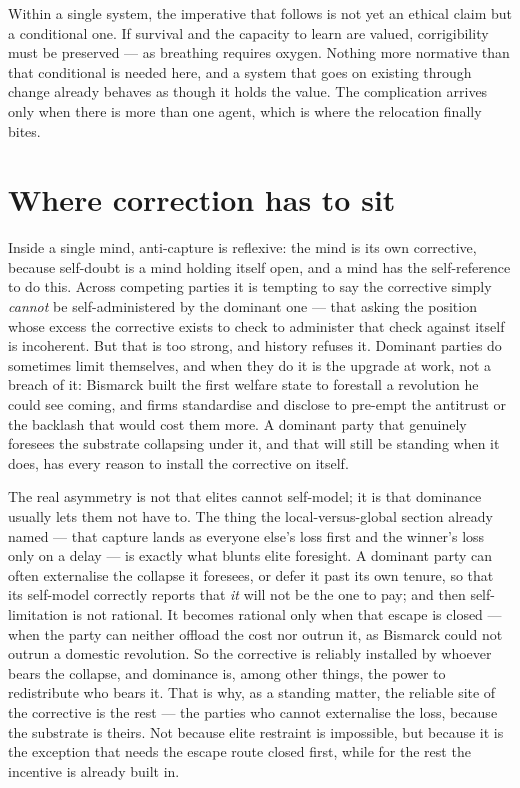 \documentclass[11pt, a4paper]{report}
\begin{document}
Within a single system, the imperative that follows is not yet an ethical claim but a conditional one. If survival and the capacity to learn are valued, corrigibility must be preserved --- as breathing requires oxygen. Nothing more normative than that conditional is needed here, and a system that goes on existing through change already behaves as though it holds the value. The complication arrives only when there is more than one agent, which is where the relocation finally bites.

\section{Where correction has to sit}

Inside a single mind, anti-capture is reflexive: the mind is its own corrective, because self-doubt is a mind holding itself open, and a mind has the self-reference to do this. Across competing parties it is tempting to say the corrective simply \textit{cannot} be self-administered by the dominant one --- that asking the position whose excess the corrective exists to check to administer that check against itself is incoherent. But that is too strong, and history refuses it. Dominant parties do sometimes limit themselves, and when they do it is the upgrade at work, not a breach of it: Bismarck built the first welfare state to forestall a revolution he could see coming, and firms standardise and disclose to pre-empt the antitrust or the backlash that would cost them more. A dominant party that genuinely foresees the substrate collapsing under it, and that will still be standing when it does, has every reason to install the corrective on itself.

The real asymmetry is not that elites cannot self-model; it is that dominance usually lets them not have to. The thing the local-versus-global section already named --- that capture lands as everyone else's loss first and the winner's loss only on a delay --- is exactly what blunts elite foresight. A dominant party can often externalise the collapse it foresees, or defer it past its own tenure, so that its self-model correctly reports that \textit{it} will not be the one to pay; and then self-limitation is not rational. It becomes rational only when that escape is closed --- when the party can neither offload the cost nor outrun it, as Bismarck could not outrun a domestic revolution. So the corrective is reliably installed by whoever bears the collapse, and dominance is, among other things, the power to redistribute who bears it. That is why, as a standing matter, the reliable site of the corrective is the rest --- the parties who cannot externalise the loss, because the substrate is theirs. Not because elite restraint is impossible, but because it is the exception that needs the escape route closed first, while for the rest the incentive is already built in.
\end{document}
